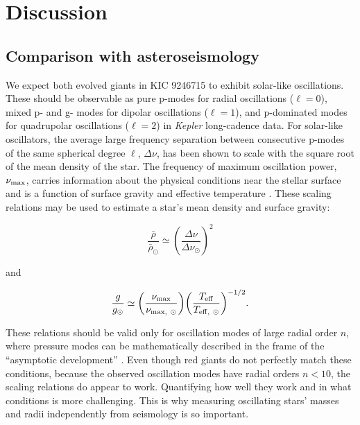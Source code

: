 \section{Discussion}\label{discuss}

\subsection{Comparison with asteroseismology}\label{seismo}

We expect both evolved giants in KIC 9246715 to exhibit solar-like oscillations. These should be observable as pure p-modes for radial oscillations ($\ell = 0$), mixed p- and g- modes for dipolar oscillations ($\ell = 1$), and p-dominated modes for quadrupolar oscillations ($\ell = 2$) in \emph{Kepler} long-cadence data. For solar-like oscillators, the average large frequency separation between consecutive p-modes of the same spherical degree $\ell$, $\Delta \nu$, has been shown to scale with the square root of the mean density of the star. The frequency of maximum oscillation power, $\nu_{\rm{max}}$, carries information about the physical conditions near the stellar surface and is a function of surface gravity and effective temperature \citep{kje95}. These scaling relations may be used to estimate a star's mean density and surface gravity:

\begin{equation} \label{density}
{\frac{\bar{\rho}}{\bar{\rho}_{\odot}}} \simeq {\left( \frac{\Delta \nu}{\Delta \nu_{\odot}} \right)}^{2}
\end{equation}

\noindent and

\begin{equation} \label{gravity}
{\frac{g}{g_{\odot}}} \simeq {\left( \frac{\nu_{\rm{max}}}{\nu_{\rm{max}, \ \odot}} \right)} {\left( \frac{T_{\rm{eff}}}{T_{\rm{eff}, \ \odot}} \right)}^{-1/2}.
\end{equation}

These relations should be valid only for oscillation modes of large radial order $n$, where pressure modes can be mathematically described in the frame of the ``asymptotic development'' \citep{tas80}. Even though red giants do not perfectly match these conditions, because the observed oscillation modes have radial orders $n < 10$, the scaling relations do appear to work. Quantifying how well they work and in what conditions is more challenging. This is why measuring oscillating stars' masses and radii independently from seismology is so important.

